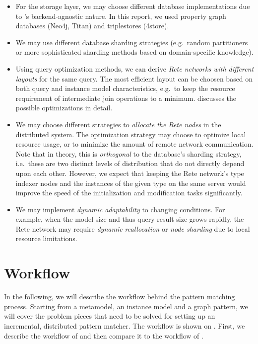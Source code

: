 \begin{itemize}
  \item For the storage layer, we may choose different database implementations due to \iqd{}'s backend-agnostic nature. In this report, we used property graph databases (Neo4j, Titan) and triplestores (4store).
  \item We may use different database sharding strategies (e.g.\ random partitioners or more sophisticated sharding methods based on domain-specific knowledge).
  \item Using query optimization methods, we can derive \emph{Rete networks with different layouts} for the same query. The most efficient layout can be choosen based on both query and instance model characteristics, e.g.\ to keep the resource requirement of intermediate join operations to a minimum. \cite{BergmannPhD} discusses the possible optimizations in detail.
  \item We may choose different strategies to \emph{allocate the Rete nodes} in the distributed system. The optimization strategy may choose to optimize local resource usage, or to minimize the amount of remote network communication. Note that in theory, this is \emph{orthogonal} to the database's sharding strategy, i.e.\ these are two distinct levels of distribution that do not directly depend upon each other. However, we expect that keeping the Rete network's type indexer nodes and the instances of the given type on the same server would improve the speed of the initialization and modification tasks significantly.
  \item We may implement \emph{dynamic adaptability} to changing conditions. For example, when the model size and thus query result size grows rapidly, the Rete network may require \emph{dynamic reallocation} or \emph{node sharding} due to local resource limitations.
\end{itemize}




\section{Workflow}
\label{workflow}


In the following, we will describe the workflow behind the pattern matching process. Starting from a metamodel, an instance model and a graph pattern, we will cover the problem pieces that need to be solved for setting up an incremental, distributed pattern matcher. The workflow is shown on . First, we describe the workflow of \eiq{} and then compare it to the workflow of \iqd{}.

